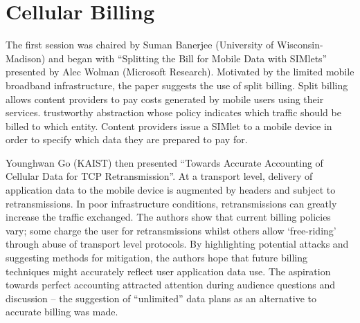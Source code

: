 \section{Cellular Billing}
\label{sec:cellbilling}

The first session was chaired by Suman Banerjee (University of Wisconsin-Madison)
and began with ``Splitting the Bill for Mobile Data with SIMlets'' presented by 
Alec Wolman (Microsoft Research). Motivated by the limited mobile broadband 
infrastructure, the paper suggests the use of split billing. Split billing allows 
content providers to pay costs generated by mobile users using their services.
trustworthy abstraction whose policy indicates which traffic should be billed to 
which entity. Content providers issue a SIMlet to a mobile device in order to 
specify which data they are prepared to pay for.

Younghwan Go (KAIST) then presented ``Towards Accurate Accounting of Cellular 
Data for TCP Retransmission''. At a transport level, delivery of application data
to the mobile device is augmented by headers and subject to retransmissions. In 
poor infrastructure  conditions, retransmissions can greatly increase the traffic 
exchanged. The authors show that current billing policies vary; some charge the 
user for retransmissions whilst others allow `free-riding' through abuse of 
transport level protocols. By highlighting potential attacks and suggesting 
methods for mitigation, the authors hope that future billing techniques might 
accurately reflect user application data use.
The aspiration towards perfect accounting attracted attention during audience
questions and discussion -- the suggestion of ``unlimited'' data plans as an
alternative to accurate billing was made.